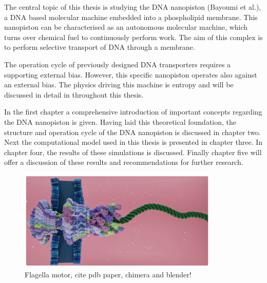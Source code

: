 The central topic of this thesis is studying the DNA nanopiston (Bayoumi et
al.\cite{Bayoumi21}), a DNA based molecular machine embedded into a phospholipid
membrane. This
nanopiston can be characterised as an autonomous molecular machine, which turns over
chemical fuel to continuously perform work. The aim of this complex is to perform
selective transport of DNA through a membrane.

The operation cycle of previously designed DNA transporters requires a supporting
external bias.\cite{Franceschini2013} However, this specific nanopiston operates also
against an external bias. The physics driving this machine is entropy and will be
discussed in detail in throughout this thesis.

In the first chapter a comprehensive introduction of important concepts
regarding the DNA nanopiston is given. Having laid this theoretical foundation, the
structure and operation cycle of the DNA nanopiston is discussed in chapter two. Next the
computational model used in this thesis is presented in chapter three. In chapter four,
the results of these simulations is discussed. Finally chapter five will offer a
discussion of these results and recommendations for further research.
\vspace{0.5cm}
\begin{figure}[ht]
\begin{center}
  \includegraphics[width=0.85\textwidth]{Figures/flagella2.png}
  \caption{Flagella motor, cite pdb paper, chimera and blender!}
\end{center}
\end{figure}
